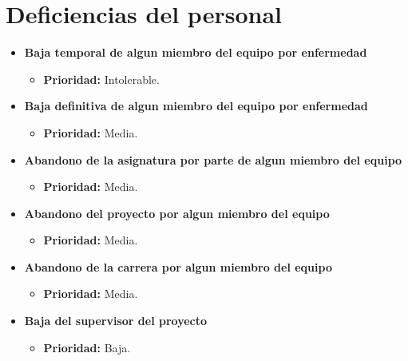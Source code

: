 \documentclass[spanish,a4paper,12pt]{report}	%
\begin{document}
%
\setcounter{section}{0}
\section{Deficiencias del personal}
	\begin{itemize}
		\item \textbf{Baja temporal de algun miembro del equipo por enfermedad}
			\begin{itemize}
				\item \textbf{Prioridad: }Intolerable.		%
			\end{itemize}
		
		\item \textbf{Baja definitiva de algun miembro del equipo por enfermedad}	
			\begin{itemize}
				\item \textbf{Prioridad: }Media.
			\end{itemize}
		
		\item \textbf{Abandono de la asignatura por parte de algun miembro del equipo}	
			\begin{itemize}
				\item \textbf{Prioridad: }Media.
			\end{itemize}
		
		\item \textbf{Abandono del proyecto por algun miembro del equipo}	
			\begin{itemize}
				\item \textbf{Prioridad: }Media.
			\end{itemize}
		
		\item \textbf{Abandono de la carrera por algun miembro del equipo}
			\begin{itemize}
				\item \textbf{Prioridad: }Media.
			\end{itemize}
		
		\item \textbf{Baja del supervisor del proyecto}
			\begin{itemize}
				\item \textbf{Prioridad: }Baja.
			\end{itemize}
	\end{itemize}
%
\end{document}

